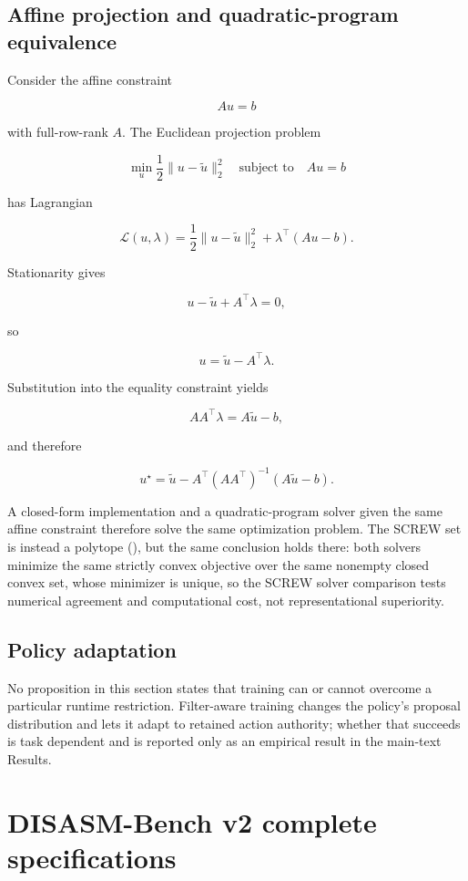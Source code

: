 \documentclass[10pt]{article}
\let\suppsection\suppname
\begin{document}
\subsection*{Affine projection and quadratic-program equivalence}

Consider the affine constraint

\[
Au=b
\]

with full-row-rank $A$. The Euclidean projection problem

\[
\min_u
\frac{1}{2}\lVert u-\tilde u\rVert_2^2
\quad
\text{subject to}
\quad
Au=b
\]

has Lagrangian

\[
\mathcal{L}(u,\lambda)
=
\frac{1}{2}\lVert u-\tilde u\rVert_2^2
+
\lambda^\top(Au-b).
\]

Stationarity gives

\[
u-\tilde u+A^\top\lambda=0,
\]

so

\[
u=\tilde u-A^\top\lambda.
\]

Substitution into the equality constraint yields

\[
AA^\top\lambda=A\tilde u-b,
\]

and therefore

\[
u^\star
=
\tilde u
-
A^\top(AA^\top)^{-1}(A\tilde u-b).
\]

A closed-form implementation and a quadratic-program solver given the same
affine constraint therefore solve the same optimization problem. The SCREW set
is instead a polytope (\suppsection{S2.1}), but the same conclusion holds there:
both solvers minimize the same strictly convex objective over the same nonempty
closed convex set, whose minimizer is unique, so the SCREW solver comparison tests numerical agreement and computational cost, not
representational superiority.


\subsection*{Policy adaptation}

No proposition in this section states that training can or cannot overcome a
particular runtime restriction. Filter-aware training changes the policy's
proposal distribution and lets it adapt to retained action authority;
whether that succeeds is task dependent and is reported only as an empirical result in the main-text Results.


\section{DISASM-Bench v2 complete specifications}
\end{document}
